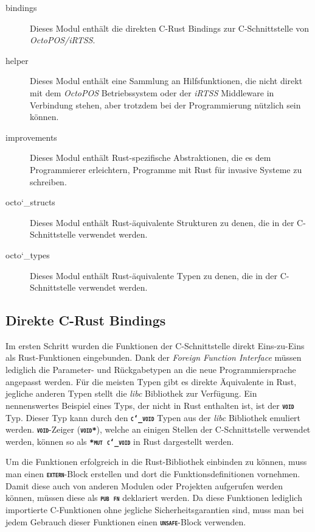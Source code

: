 \begin{description}

	\item[bindings] 
	Dieses Modul enthält die direkten C-Rust Bindings zur C-Schnittstelle von \textit{OctoPOS/iRTSS}.
	
	\item[helper]
	Dieses Modul enthält eine Sammlung an Hilfsfunktionen, die nicht direkt mit dem \textit{OctoPOS} Betriebssystem 
	oder der \textit{iRTSS} Middleware in Verbindung stehen, aber trotzdem bei der Programmierung
	nützlich sein können.
	
	\item[improvements]
	Dieses Modul enthält Rust-spezifische Abstraktionen, die es dem Programmierer erleichtern,
	Programme mit Rust für invasive Systeme zu schreiben.
	
	\item[octo\char`_structs]
	Dieses Modul enthält Rust-äquivalente Strukturen zu denen, die in der C-Schnittstelle verwendet werden.
	
	\item[octo\char`_types]
	Dieses Modul enthält Rust-äquivalente Typen zu denen, die in der C-Schnittstelle verwendet werden.

\end{description}

\subsection{Direkte C-Rust Bindings}

Im ersten Schritt wurden die Funktionen der C-Schnittstelle direkt Eins-zu-Eins als Rust-Funktionen eingebunden.
Dank der \textit{Foreign Function Interface} müssen lediglich die Parameter- und Rückgabetypen
an die neue Programmiersprache angepasst werden.
Für die meisten Typen gibt es direkte Äquivalente in Rust, jegliche anderen Typen
stellt die \textit{libc} Bibliothek zur Verfügung. Ein nennenswertes Beispiel eines Typs, der nicht in Rust enthalten 
ist, ist der \texttt{\textsc{\textbf{void}}} Typ. Dieser Typ kann durch den
\texttt{\textsc{\textbf{c\char`_void}}} Typen aus der \textit{libc} Bibliothek emuliert werden.
\texttt{\textsc{\textbf{void}}}-Zeiger (\texttt{\textsc{\textbf{void*}}}), welche an einigen Stellen der
C-Schnittstelle verwendet werden, können so als \texttt{\textsc{\textbf{*mut c\char`_void}}} in Rust
dargestellt werden.

Um die Funktionen erfolgreich in die Rust-Bibliothek einbinden zu können,
muss man einen \texttt{\textsc{\textbf{extern}}}-Block erstellen und dort
die Funktionsdefinitionen vornehmen.
Damit diese auch von anderen Modulen oder Projekten aufgerufen werden können, müssen diese
als \texttt{\textsc{\textbf{pub fn}}} deklariert werden.
Da diese Funktionen lediglich importierte C-Funktionen ohne jegliche Sicherheitsgarantien
sind, muss man bei jedem Gebrauch dieser Funktionen einen \texttt{\textsc{\textbf{unsafe}}}-Block verwenden.

